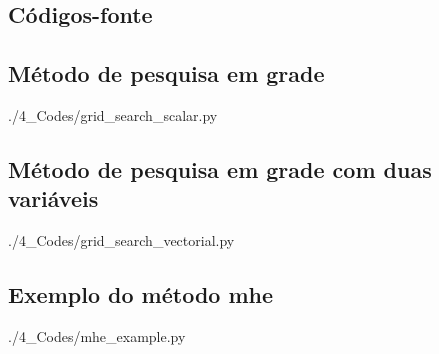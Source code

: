 \begin{apendicesenv}

\partapendices

\chapter{Códigos-fonte}
\label{ch:codigos_extras}

\section{Método de pesquisa em grade}


	{./4_Codes/grid_search_scalar.py}
	\begin{center}
	\end{center}

\section{Método de pesquisa em grade com duas variáveis}


	{./4_Codes/grid_search_vectorial.py}
	\begin{center}
	\end{center}

\section{Exemplo do método \acrlong{mhe}}


	{./4_Codes/mhe_example.py}
	\begin{center}
	\end{center}


\end{apendicesenv}
